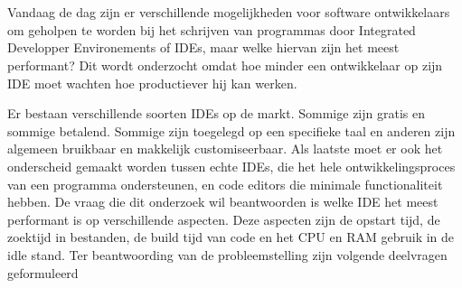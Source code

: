 
%
%

%



\chapter*{}

Vandaag de dag zijn er verschillende mogelijkheden voor software ontwikkelaars om geholpen te worden bij het schrijven van programmas door Integrated Developper Environements of IDEs, maar welke hiervan zijn het meest performant? Dit wordt onderzocht omdat hoe minder een ontwikkelaar op zijn IDE moet wachten hoe productiever hij kan werken.

Er bestaan verschillende soorten IDEs op de markt. Sommige zijn gratis en sommige betalend. Sommige zijn toegelegd op een specifieke taal en anderen zijn algemeen bruikbaar en makkelijk customiseerbaar. Als laatste moet er ook het onderscheid gemaakt worden tussen echte IDEs, die het hele ontwikkelingsproces van een programma ondersteunen, en code editors die minimale functionaliteit hebben. De vraag die dit onderzoek wil beantwoorden is welke IDE het meest performant is op verschillende aspecten. Deze aspecten zijn de opstart tijd, de zoektijd in bestanden, de build tijd van code en het CPU en RAM gebruik in de idle stand. 
Ter beantwoording van de probleemstelling zijn volgende deelvragen geformuleerd

